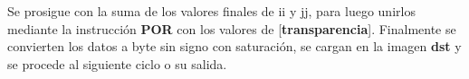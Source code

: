 Se prosigue con la suma de los valores finales de ii y jj, para luego unirlos mediante la instrucción \textbf{POR} con los valores de [\textbf{transparencia}]. Finalmente se convierten los datos a byte sin signo con saturación, se cargan en la imagen \textbf{dst} y se procede al siguiente ciclo o su salida.

